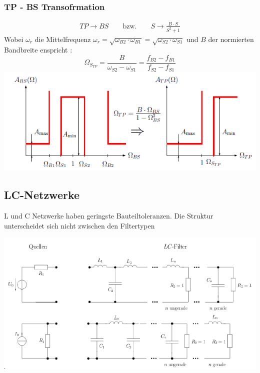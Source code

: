 \subsubsection{TP - BS Transofrmation}
\begin{align*}
	TP \rightarrow BS \qquad \text{bzw.} \qquad S \rightarrow \frac{B\cdot S}{S^2 + 1}
\end{align*}
Wobei $\omega_r$ die Mittelfrequenz $\omega_r = \sqrt{\omega_{B2}\cdot \omega_{B1}} =  \sqrt{\omega_{S2}\cdot \omega_{S1}}$ und $B$ der normierten Bandbreite enspricht :
\[
\Omega_{S_{TP}} = \frac{B}{\omega_{S2} - \omega_{S1}} = \frac{f_{B2} - f_{B1}}{f_{S2} - f_{S1}}
\]
\includegraphics[width=\columnwidth]{Images/tpbs}


\subsection{LC-Netzwerke}
L und C Netzwerke haben geringste Bauteiltoleranzen. Die Struktur unterscheidet sich nicht zwischen den Filtertypen

\begin{center}
	\includegraphics[width=\columnwidth]{Images/struktur}
\end{center}
